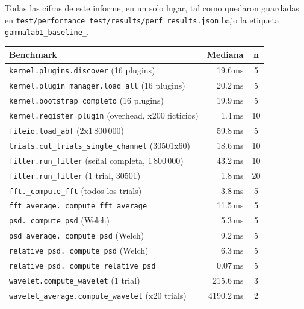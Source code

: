 \documentclass[11pt,a4paper]{article}
\begin{document}
Todas las cifras de este informe, en un solo lugar, tal como quedaron guardadas en
\texttt{test/performance\_\allowbreak test/results/perf\_\allowbreak results.json} bajo la etiqueta
\texttt{gammalab1\_\allowbreak baseline\_}.

\begin{center}
\begin{longtable}{L{9.5cm}rc}
\toprule
\textbf{Benchmark} & \textbf{Mediana} & \textbf{n} \\
\midrule
\endhead
\texttt{kernel.plugins.discover} (16 plugins) & 19.6\,ms & 5 \\
\texttt{kernel.plugin\_\allowbreak manager.load\_\allowbreak all} (16 plugins) & 20.2\,ms & 5 \\
\texttt{kernel.bootstrap\_\allowbreak completo} (16 plugins) & 19.9\,ms & 5 \\
\texttt{kernel.register\_\allowbreak plugin} (overhead, x200 ficticios) & 1.4\,ms & 10 \\
\texttt{fileio.load\_\allowbreak abf} (2x1\,800\,000) & 59.8\,ms & 5 \\
\texttt{trials.cut\_\allowbreak trials\_\allowbreak single\_\allowbreak channel} (30501x60) & 18.6\,ms & 10 \\
\texttt{filter.run\_\allowbreak filter} (señal completa, 1\,800\,000) & 43.2\,ms & 10 \\
\texttt{filter.run\_\allowbreak filter} (1 trial, 30501) & 1.8\,ms & 20 \\
\texttt{fft.\_\allowbreak compute\_\allowbreak fft} (todos los trials) & 3.8\,ms & 5 \\
\texttt{fft\_\allowbreak average.\_\allowbreak compute\_\allowbreak fft\_\allowbreak average} & 11.5\,ms & 5 \\
\texttt{psd.\_\allowbreak compute\_\allowbreak psd} (Welch) & 5.3\,ms & 5 \\
\texttt{psd\_\allowbreak average.\_\allowbreak compute\_\allowbreak psd} (Welch) & 9.2\,ms & 5 \\
\texttt{relative\_\allowbreak psd.\_\allowbreak compute\_\allowbreak psd} (Welch) & 6.3\,ms & 5 \\
\texttt{relative\_\allowbreak psd.\_\allowbreak compute\_\allowbreak relative\_\allowbreak psd} & 0.07\,ms & 5 \\
\texttt{wavelet.compute\_\allowbreak wavelet} (1 trial) & 215.6\,ms & 3 \\
\texttt{wavelet\_\allowbreak average.compute\_\allowbreak wavelet} (x20 trials) & 4190.2\,ms & 2 \\

\end{longtable}
\end{center}
\end{document}

